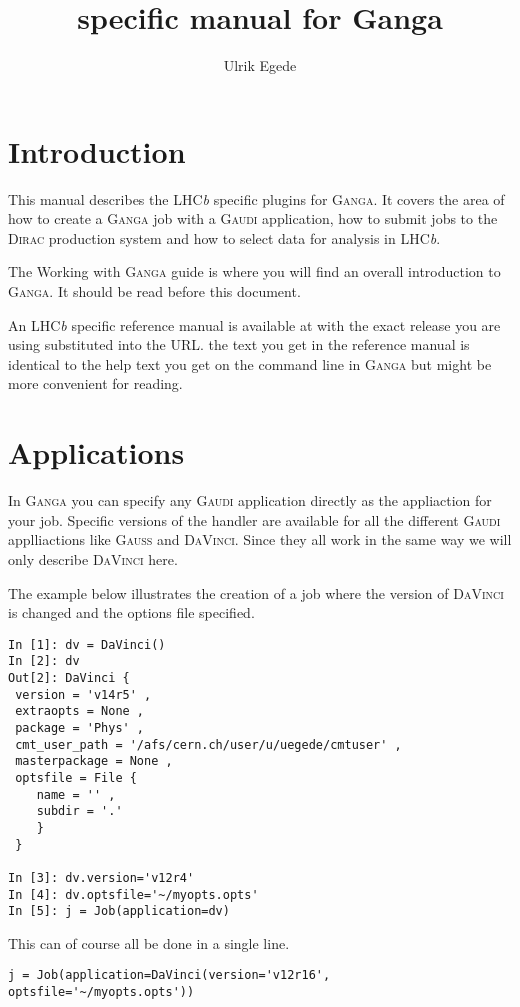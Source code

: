 \documentclass{howto}
\title{\lhcb specific manual for Ganga \totalv}
\author{Ulrik Egede}
\def\ganga {\textsc{Ganga}\xspace}
\def\lhcb {LHC{\em b\/}\xspace}
\def\gaudi {\textsc{Gaudi}\xspace}
\def\davinci {\textsc{DaVinci}\xspace}
\def\dirac {\textsc{Dirac}\xspace}
\def\gauss {\textsc{Gauss}\xspace}
\begin{document}
\maketitle
\tableofcontents

\section{Introduction}
\noindent
This manual describes the \lhcb specific plugins for \ganga. It covers the
area of how to create a \ganga job with a \gaudi application, how to submit
jobs to the \dirac production system and how to select data for analysis in
\lhcb.

\begin{seealso}
  The Working with \ganga guide is where you will find an overall introduction
  to \ganga. It should be read before this document.
\end{seealso}

\begin{seealso}
  An \lhcb specific reference manual is available at 
  with the exact release you are using substituted into the URL. the text you
  get in the reference manual is identical to the help text you get on the
  command line in \ganga but might be more convenient for reading.
\end{seealso}

\section{Applications}
\label{sec:gaudi}
In \ganga you can specify any \gaudi application directly as the appliaction
for your job. Specific versions of the handler are available for all the
different \gaudi applliactions like \gauss and \davinci. Since they all work
in the same way we will only describe \davinci here.

The example below illustrates the creation of a job where the version of
\davinci is changed and the options file specified.
\begin{verbatim}
In [1]: dv = DaVinci()
In [2]: dv
Out[2]: DaVinci {
 version = 'v14r5' ,
 extraopts = None ,
 package = 'Phys' ,
 cmt_user_path = '/afs/cern.ch/user/u/uegede/cmtuser' ,
 masterpackage = None ,
 optsfile = File {
    name = '' ,
    subdir = '.'
    }
 }

In [3]: dv.version='v12r4'
In [4]: dv.optsfile='~/myopts.opts'
In [5]: j = Job(application=dv)
\end{verbatim}
This can of course all be done in a single line.
\begin{verbatim}
j = Job(application=DaVinci(version='v12r16', optsfile='~/myopts.opts'))
\end{verbatim}
\end{document}
